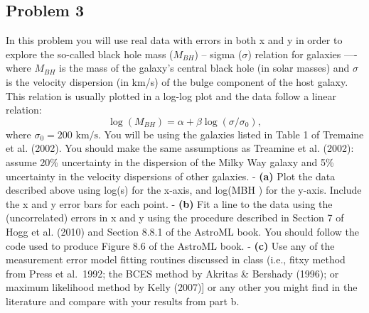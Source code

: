 \documentclass[11pt]{article}
\begin{document}
    \hypertarget{problem-3}{%
\subsection{Problem 3}\label{problem-3}}

    In this problem you will use real data with errors in both x and y in
order to explore the so-called black hole mass (\(M_{BH}\)) -- sigma
(\(σ\)) relation for galaxies ---- where \(M_{BH}\) is the mass of the
galaxy's central black hole (in solar masses) and \(σ\) is the velocity
dispersion (in km/s) of the bulge component of the host galaxy. This
relation is usually plotted in a log-log plot and the data follow a
linear relation: \[\log(M_{BH}) = \alpha + \beta\log(\sigma/\sigma_0),\]
where \(\sigma_0 = 200\text{ km/s.}\) You will be using the galaxies
listed in Table 1 of Tremaine et al. (2002). You should make the same
assumptions as Treamine et al. (2002): assume 20\% uncertainty in the
dispersion of the Milky Way galaxy and 5\% uncertainty in the velocity
dispersions of other galaxies. - \textbf{(a)} Plot the data described
above using log(s) for the x-axis, and log(MBH ) for the y-axis. Include
the x and y error bars for each point. - \textbf{(b)} Fit a line to the
data using the (uncorrelated) errors in x and y using the procedure
described in Section 7 of Hogg et al. (2010) and Section 8.8.1 of the
AstroML book. You should follow the code used to produce Figure 8.6 of
the AstroML book. - \textbf{(c)} Use any of the measurement error model
fitting routines discussed in class (i.e., fitxy method from Press et
al.~1992; the BCES method by Akritas \& Bershady (1996); or maximum
likelihood method by Kelly (2007){]} or any other you might find in the
literature and compare with your results from part b.
\end{document}
